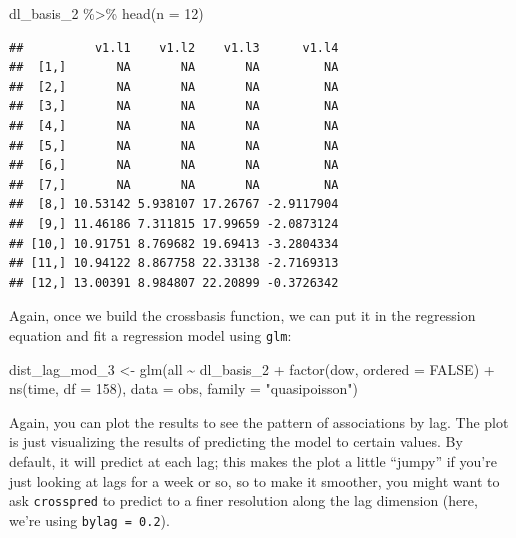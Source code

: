 \documentclass[
]{book}
\newenvironment{Shaded}{\begin{snugshade}}{\end{snugshade}}
\newcommand{\AttributeTok}[1]{\textcolor[rgb]{0.77,0.63,0.00}{#1}}
\newcommand{\ConstantTok}[1]{\textcolor[rgb]{0.00,0.00,0.00}{#1}}
\newcommand{\DecValTok}[1]{\textcolor[rgb]{0.00,0.00,0.81}{#1}}
\newcommand{\FunctionTok}[1]{\textcolor[rgb]{0.00,0.00,0.00}{#1}}
\newcommand{\NormalTok}[1]{#1}
\newcommand{\OtherTok}[1]{\textcolor[rgb]{0.56,0.35,0.01}{#1}}
\newcommand{\SpecialCharTok}[1]{\textcolor[rgb]{0.00,0.00,0.00}{#1}}
\newcommand{\StringTok}[1]{\textcolor[rgb]{0.31,0.60,0.02}{#1}}
\begin{document}
\begin{Shaded}
\begin{Highlighting}[]
\NormalTok{dl\_basis\_2 }\SpecialCharTok{\%\textgreater{}\%} 
  \FunctionTok{head}\NormalTok{(}\AttributeTok{n =} \DecValTok{12}\NormalTok{)}
\end{Highlighting}
\end{Shaded}

\begin{verbatim}
##          v1.l1    v1.l2    v1.l3      v1.l4
##  [1,]       NA       NA       NA         NA
##  [2,]       NA       NA       NA         NA
##  [3,]       NA       NA       NA         NA
##  [4,]       NA       NA       NA         NA
##  [5,]       NA       NA       NA         NA
##  [6,]       NA       NA       NA         NA
##  [7,]       NA       NA       NA         NA
##  [8,] 10.53142 5.938107 17.26767 -2.9117904
##  [9,] 11.46186 7.311815 17.99659 -2.0873124
## [10,] 10.91751 8.769682 19.69413 -3.2804334
## [11,] 10.94122 8.867758 22.33138 -2.7169313
## [12,] 13.00391 8.984807 22.20899 -0.3726342
\end{verbatim}

Again, once we build the crossbasis function, we can put it in the regression equation and
fit a regression model using \texttt{glm}:

\begin{Shaded}
\begin{Highlighting}[]
\NormalTok{dist\_lag\_mod\_3 }\OtherTok{\textless{}{-}} \FunctionTok{glm}\NormalTok{(all }\SpecialCharTok{\textasciitilde{}}\NormalTok{ dl\_basis\_2 }\SpecialCharTok{+} 
                        \FunctionTok{factor}\NormalTok{(dow, }\AttributeTok{ordered =} \ConstantTok{FALSE}\NormalTok{) }\SpecialCharTok{+}
                          \FunctionTok{ns}\NormalTok{(time, }\AttributeTok{df =} \DecValTok{158}\NormalTok{), }
                        \AttributeTok{data =}\NormalTok{ obs, }\AttributeTok{family =} \StringTok{"quasipoisson"}\NormalTok{)}
\end{Highlighting}
\end{Shaded}

Again, you can plot the results to see the pattern of associations by lag. The plot
is just visualizing the results of predicting the model to certain values. By default,
it will predict at each lag; this makes the plot a little ``jumpy'' if you're just looking
at lags for a week or so, so to make it smoother, you might want to ask \texttt{crosspred} to
predict to a finer resolution along the lag dimension (here, we're using \texttt{bylag\ =\ 0.2}).
\end{document}
